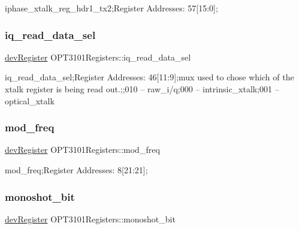 iphase\+\_\+xtalk\+\_\+reg\+\_\+hdr1\+\_\+tx2;Register Addresses\+: 57\mbox{[}15\+:0\mbox{]}; 

\mbox{\label{class_o_p_t3101_registers_a8e982a79b8a5b98ab4d5d3a81824fec3}} 
\subsubsection{\texorpdfstring{iq\+\_\+read\+\_\+data\+\_\+sel}{iq\_read\_data\_sel}}
{\footnotesize\ttfamily \mbox{\hyperlink{classdev_register}{dev\+Register}} O\+P\+T3101\+Registers\+::iq\+\_\+read\+\_\+data\+\_\+sel}



iq\+\_\+read\+\_\+data\+\_\+sel;Register Addresses\+: 46\mbox{[}11\+:9\mbox{]};mux used to chose which of the xtalk register is being read out.;;010 -- raw\+\_\+i/q;000 -- intrinsic\+\_\+xtalk;001 -- optical\+\_\+xtalk 

\mbox{\label{class_o_p_t3101_registers_a264e99791a65b5de4ffab4cdf628ba68}} 
\subsubsection{\texorpdfstring{mod\+\_\+freq}{mod\_freq}}
{\footnotesize\ttfamily \mbox{\hyperlink{classdev_register}{dev\+Register}} O\+P\+T3101\+Registers\+::mod\+\_\+freq}



mod\+\_\+freq;Register Addresses\+: 8\mbox{[}21\+:21\mbox{]}; 

\mbox{\label{class_o_p_t3101_registers_a79994294c8a143e3feda38b5fff07055}} 
\subsubsection{\texorpdfstring{monoshot\+\_\+bit}{monoshot\_bit}}
{\footnotesize\ttfamily \mbox{\hyperlink{classdev_register}{dev\+Register}} O\+P\+T3101\+Registers\+::monoshot\+\_\+bit}




